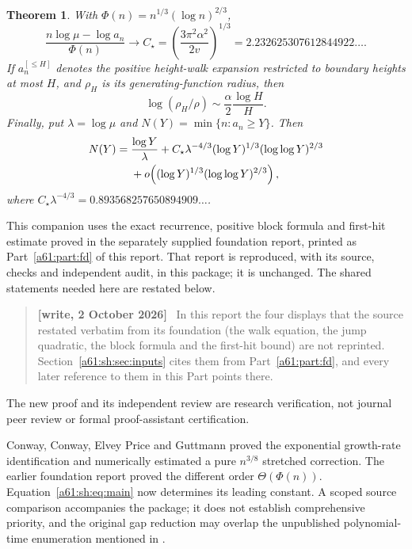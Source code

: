 \documentclass[11pt,letterpaper]{article}
\numberwithin{equation}{section}
\newtheorem{theorem}{Theorem}[section]
\theoremstyle{remark}\newtheorem{remark}[theorem]{Remark}
\newcommand{\st}{\star}
\newenvironment{writenote}{\par\smallskip\begin{quote}\small\textbf{[write, 2 October 2026]}\ }{\end{quote}\smallskip}
\begin{document}
\begin{theorem}\label{a61:sh:thm:main}
With $\Phi(n)=n^{1/3}(\log n)^{2/3}$,
\begin{equation}\label{a61:sh:eq:main}
 \frac{n\log\mu-\log a_n}{\Phi(n)}\longrightarrow
 C_\st=\left(\frac{3\pi^2\alpha^2}{2v}\right)^{1/3}
 =2.232625307612844922\ldots.
\end{equation}
If $a_n^{[\le H]}$ denotes the positive height-walk expansion restricted to boundary heights at most $H$, and $\rho_H$ is its generating-function radius, then
\begin{equation}\label{a61:sh:eq:radius}
 \log(\rho_H/\rho)\sim\frac\alpha2\frac{\log H}{H}.
\end{equation}
Finally, put $\lambda=\log\mu$ and $N(Y)=\min\{n:a_n\ge Y\}$. Then
\begin{align}\label{a61:sh:eq:inverse}
 N(Y)={}&\frac{\log Y}{\lambda}
 +C_\st\lambda^{-4/3}(\log Y)^{1/3}(\log\log Y)^{2/3}\notag\\
 &+o\!\left((\log Y)^{1/3}(\log\log Y)^{2/3}\right),
\end{align}
where $C_\st\lambda^{-4/3}=0.893568257650894909\ldots$.
\end{theorem}

This companion uses the exact recurrence, positive block formula and first-hit estimate proved in the separately supplied foundation report, printed as Part~\ref{a61:part:fd} of this report. That report is reproduced, with its source, checks and independent audit, in this package; it is unchanged. The shared statements needed here are restated below.
\begin{writenote}
In this report the four displays that the source restated verbatim from its foundation (the walk equation, the jump quadratic, the block formula and the first-hit bound) are not reprinted. Section~\ref{a61:sh:sec:inputs} cites them from Part~\ref{a61:part:fd}, and every later reference to them in this Part points there.
\end{writenote}
 The new proof and its independent review are research verification, not journal peer review or formal proof-assistant certification.

Conway, Conway, Elvey Price and Guttmann \cite{Conway} proved the exponential growth-rate identification and numerically estimated a pure $n^{3/8}$ stretched correction. The earlier foundation report proved the different order $\Theta(\Phi(n))$. Equation~\eqref{a61:sh:eq:main} now determines its leading constant. A scoped source comparison accompanies the package; it does not establish comprehensive priority, and the original gap reduction may overlap the unpublished polynomial-time enumeration mentioned in \cite{Conway}.
\end{document}
